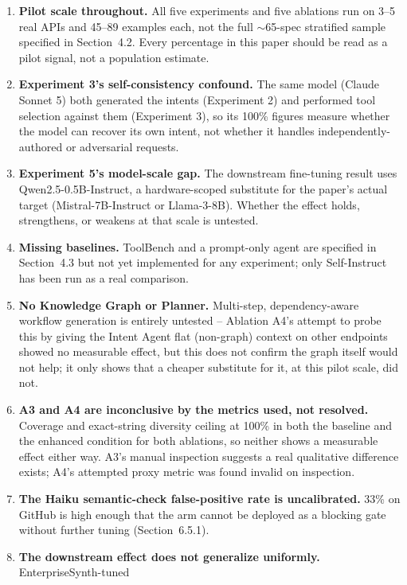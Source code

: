 \documentclass[11pt]{article}
\begin{document}
\begin{enumerate}
    \item \textbf{Pilot scale throughout.} All five experiments and five ablations run on 3--5
    real APIs and 45--89 examples each, not the full $\sim$65-spec stratified sample specified in
    Section~4.2. Every percentage in this paper should be read as a pilot signal, not a
    population estimate.
    \item \textbf{Experiment 3's self-consistency confound.} The same model (Claude Sonnet 5)
    both generated the intents (Experiment 2) and performed tool selection against them
    (Experiment 3), so its 100\% figures measure whether the model can recover its own intent,
    not whether it handles independently-authored or adversarial requests.
    \item \textbf{Experiment 5's model-scale gap.} The downstream fine-tuning result uses
    Qwen2.5-0.5B-Instruct, a hardware-scoped substitute for the paper's actual target
    (Mistral-7B-Instruct or Llama-3-8B). Whether the effect holds, strengthens, or weakens at that
    scale is untested.
    \item \textbf{Missing baselines.} ToolBench and a prompt-only agent are specified in
    Section~4.3 but not yet implemented for any experiment; only Self-Instruct has been run as a
    real comparison.
    \item \textbf{No Knowledge Graph or Planner.} Multi-step, dependency-aware workflow
    generation is entirely untested -- Ablation A4's attempt to probe this by giving the Intent
    Agent flat (non-graph) context on other endpoints showed no measurable effect, but this does
    not confirm the graph itself would not help; it only shows that a cheaper substitute for it,
    at this pilot scale, did not.
    \item \textbf{A3 and A4 are inconclusive by the metrics used, not resolved.} Coverage and
    exact-string diversity ceiling at 100\% in both the baseline and the enhanced condition for
    both ablations, so neither shows a measurable effect either way. A3's manual inspection
    suggests a real qualitative difference exists; A4's attempted proxy metric was found invalid
    on inspection.
    \item \textbf{The Haiku semantic-check false-positive rate is uncalibrated.} 33\% on GitHub
    is high enough that the arm cannot be deployed as a blocking gate without further tuning
    (Section~6.5.1).
    \item \textbf{The downstream effect does not generalize uniformly.} EnterpriseSynth-tuned

\end{enumerate}
\end{document}
